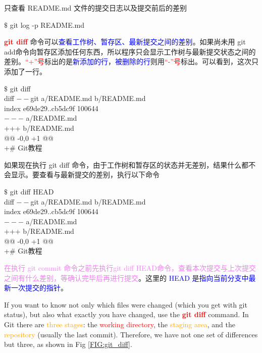 \documentclass[12pt,a4paper]{article}
\begin{document}
只查看 README.md 文件的提交日志以及提交前后的差别
\begin{tcolorbox}[colback=green!5,colframe=green!40!black,title= ]
$\$$ git log -p README.md
\end{tcolorbox}
\textcolor{red}{\bf git diff} 命令可以\textcolor{blue}{查看工作树、暂存区、最新提交之间的差别}。如果尚未用 git add命令向暂存区添加任何东西，所以程序只会显示工作树与最新提交状态之间的差别。\textcolor{red}{``+”号}标出的是\textcolor{blue}{新添加的行}，\textcolor{blue}{被删除的行}则用\textcolor{red}{``-”号}标出。可以看到，这次只添加了一行。
\begin{tcolorbox}[colback=green!5,colframe=green!40!black,title= ]
$\$$ git diff \\
diff $--$git a/README.md b/README.md \\
index e69de29..cb5dc9f 100644 \\
$---$ a/README.md \\
+++ b/README.md \\
@@ -0,0 +1 @@ \\
+$\#$ Git教程
\end{tcolorbox}
如果现在执行 git diff 命令，由于工作树和暂存区的状态并无差别，结果什么都不会显示。要查看与最新提交的差别，执行以下命令
\begin{tcolorbox}[colback=green!5,colframe=green!40!black,title= ]
$\$$ git diff HEAD \\
diff $--$git a/README.md b/README.md \\
index e69de29..cb5dc9f 100644 \\
$---$ a/README.md \\
+++ b/README.md \\
@@ -0,0 +1 @@ \\
+$\#$ Git教程
\end{tcolorbox}
\textcolor{violet}{在执行 git commit 命令之前先执行git diff HEAD命令，查看本次提交与上次提交之间有什么差别，等确认完毕后再进行提交}。这里的 \textcolor{blue}{HEAD 是指向当前分支中最新一次提交的指针}。


\cite{narębski2016mastering} If you want to know not only which files were changed (which you get with git status), but also what exactly you have changed, use the \textcolor{red}{\bf git diff} command. In Git there are \textcolor{orange}{three stages}: the \textcolor{red}{working directory}, the \textcolor{orange}{staging area}, and the \textcolor{orange}{repository} (usually the last commit). Therefore, we have not one set of differences but three, as shown in Fig \ref{FIG:git_diff}.
\end{document}
